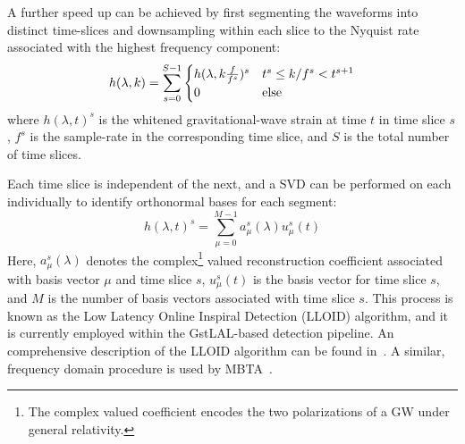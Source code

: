 \documentclass[twocolumn,prd,superscriptaddress,nofootinbib]{revtex4-1}
\begin{document}
A further speed up can be achieved by first
segmenting the waveforms into distinct time-slices and downsampling within each
slice to the Nyquist rate associated with the highest frequency component:
%
\begin{equation} h(\lambda,k) = \sum_{s=0}^{S-1}
\begin{cases} h(\lambda,k\frac{f}{f^s})^{s} & t^s \leq k/f^s < t^{s+1} \\
0 & \rm{else}
\end{cases}
\end{equation}
%
where $h(\lambda,t)^s$ is the
whitened gravitational-wave strain at time $t$ in time slice $s$, $f^s$ is
the sample-rate in the corresponding time slice, and $S$ is the total number of time slices.

Each time slice is independent of the next, and a SVD
can be performed on each individually to identify orthonormal bases for each
segment:
%
\begin{equation} h(\lambda, t)^{s} = \sum_{\mu=0}^{M-1} a_\mu^{s}(\lambda) u_\mu^{s}(t) \end{equation}
%
Here, $a_\mu^s(\lambda)$ denotes the complex\footnote{The complex valued coefficient encodes the two polarizations
of a GW under general relativity.} valued reconstruction coefficient
associated with basis vector $\mu$ and time slice $s$, $u_\mu^s(t)$ is the
basis vector for time slice $s$, and $M$ is the number of basis vectors
associated with time slice $s$. This process is known as the Low Latency Online
Inspiral Detection (LLOID) algorithm, and it is currently employed within the
GstLAL-based detection pipeline. An comprehensive description of the LLOID
algorithm can be found in~\cite{Cannon:2011vi}. A similar, frequency domain
procedure is used by MBTA~\cite{Adams:2015ulm}. 
\end{document}
